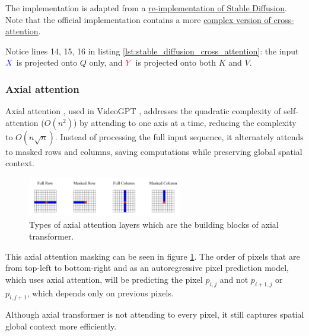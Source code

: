 The implementation is adapted from a \href{https://github.com/hkproj/pytorch-stable-diffusion/blob/e0cb06de011787cdf13eed7b4287ad8410491149/sd/attention.py#L100C1-L110C28}{re-implementation of Stable Diffusion}. Note that the official implementation contains a more \href{https://github.com/CompVis/stable-diffusion/blob/21f890f9da3cfbeaba8e2ac3c425ee9e998d5229/ldm/modules/attention.py#L152}{complex version of cross-attention}.

Notice lines 14, 15, 16 in listing \ref{lst:stable_diffusion_cross_attention}: the input $\textcolor{blue}{X}$ is projected onto $Q$ only, and $\textcolor{red}{Y}$ is projected onto both $K$ and $V$.














\subsubsection{Axial attention}

Axial attention \cite{axial_attention}, used in VideoGPT \cite{videogpt}, addresses the quadratic complexity of self-attention ($O(n^2)$) by attending to one axis at a time, reducing the complexity to $O(n\sqrt{n})$. Instead of processing the full input sequence, it alternately attends to masked rows and columns, saving computations while preserving global spatial context.

\begin{figure}
    \centering
    \includegraphics[width=0.6\textwidth]{images/appendix/attention/axial.png}
    \caption{Types of axial attention layers which are the building blocks of axial transformer.}
    \label{fig:axial_attention}
\end{figure}

This axial attention masking can be seen in figure \ref{fig:axial_attention}. The order of pixels that are from top-left to bottom-right and as an autoregressive pixel prediction model, which uses axial attention, will be predicting the pixel $p_{i, j}$ and not $p_{i+1, j}$ or $p_{i, j+1}$, which depends only on previous pixels.

Although axial transformer is not attending to every pixel, it still captures spatial global context more efficiently.
